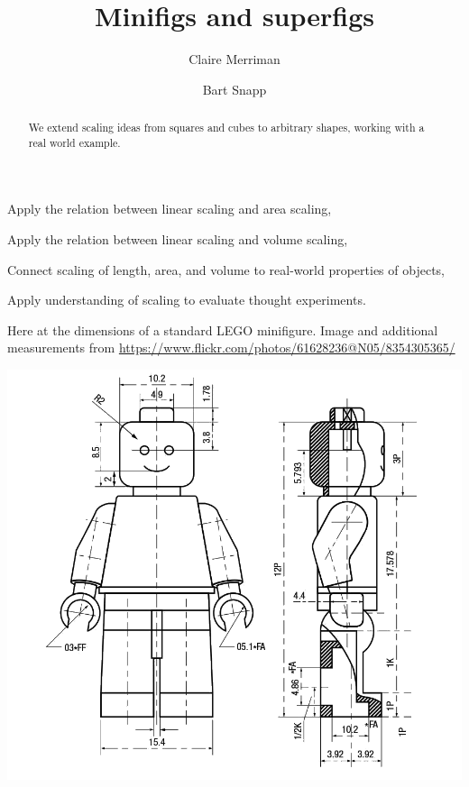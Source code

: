\documentclass[handout,nooutcomes,noauthor,hints]{ximera}
\title{Minifigs and superfigs}
\author{Claire Merriman \and Bart Snapp}
\begin{document}
\begin{abstract}
  We extend scaling ideas from squares and cubes to arbitrary shapes,
  working with a real world example.
\end{abstract}
\maketitle

\begin{listOutcomes}
\item Apply the relation between linear scaling and area scaling,
\item Apply the relation between linear scaling and volume scaling,
\item Connect scaling of length, area, and volume to real-world properties of objects,
\item Apply understanding of scaling to evaluate thought experiments.
\end{listOutcomes}


Here at the dimensions of a standard LEGO minifigure. Image and
additional measurements from
\url{https://www.flickr.com/photos/61628236@N05/8354305365/}
\begin{center}
 \includegraphics[height=.55\textheight]{lego-minifigure.png}
\end{center}
\end{document}
